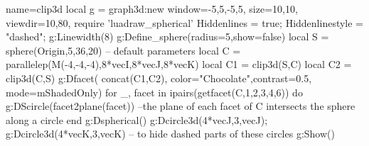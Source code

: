 \documentclass[border=5pt]{standalone}
\begin{document}
\begin{luadraw}{name=clip3d}
    local g = graph3d:new{
        window={-5,5,-5,5},
        size={10,10},
        viewdir={10,80},
    }
    require 'luadraw_spherical'
    Hiddenlines = true; Hiddenlinestyle = "dashed"; g:Linewidth(8)
    g:Define_sphere({radius=5,show=false})
    local S = sphere(Origin,5,36,20) -- default parameters
    local C = parallelep(M(-4,-4,-4),8*vecI,8*vecJ,8*vecK)
    local C1 = clip3d(S,C) 
    local C2 = clip3d(C,S)
    g:Dfacet( concat(C1,C2), {color="Chocolate",contrast=0.5, mode=mShadedOnly})
    for _, facet in ipairs(getfacet(C,{1,2,3,4,6})) do
        g:DScircle(facet2plane(facet)) --the plane of each facet of C intersects the sphere along a circle
    end 
    g:Dspherical()
    g:Dcircle3d(4*vecJ,3,vecJ); g:Dcircle3d(4*vecK,3,vecK) -- to hide dashed parts of these circles
    g:Show()
\end{luadraw}
\end{document}
